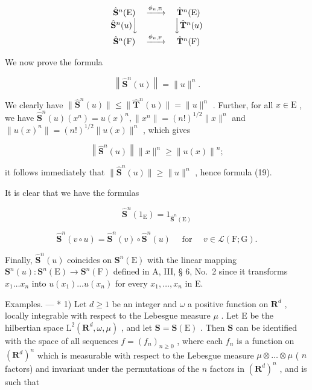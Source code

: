 \[
\begin{array}{c c c} \hat {\mathbf {S}} ^ {n} (\mathrm{E}) & \xrightarrow {\phi_ {n , \mathrm{E}}} & \hat {\mathbf {T}} ^ {n} (\mathrm{E}) \\ \hat {\mathbf {S}} ^ {n} (u) \Big \downarrow & & \Big \downarrow \hat {\mathbf {T}} ^ {n} (u) \\ \hat {\mathbf {S}} ^ {n} (\mathrm{F}) & \xrightarrow {\phi_ {n , \mathrm{F}}} & \hat {\mathbf {T}} ^ {n} (\mathrm{F}) \end{array}
\]

We now prove the formula

\[
\left\| \hat {\mathbf {S}} ^ {n} (u) \right\| = \| u \| ^ {n}.\tag{19}
\]

We clearly have \(\| \hat{\mathbf{S}}^n (u)\| \leqslant \| \hat{\mathbf{T}}^n (u)\| = \| u\| ^n\) . Further, for all \(x\in \mathrm{E}\) , we have \(\hat{\mathbf{S}}^n (u)(x^n) = u(x)^n,\| x^n\| = (n!)^{1 / 2}\| x\| ^n\) and \(\| u(x)^n\| = (n!)^{1 / 2}\| u(x)\| ^n\) , which gives

\[
\left\| \hat {\mathbf {S}} ^ {n} (u) \right\| \| x \| ^ {n} \geqslant \left\| u (x) \right\| ^ {n};
\]

it follows immediately that \(\| \hat{\mathbf{S}}^n (u)\| \geqslant \| u\| ^n\) , hence formula (19).

It is clear that we have the formulas

\[
\hat {\mathbf {S}} ^ {n} (1 _ {\mathrm{E}}) = 1 _ {\hat {\mathbf {S}} ^ {n} (\mathrm{E})}\tag{20}
\]

\[
\hat {\mathbf {S}} ^ {n} (v \circ u) = \hat {\mathbf {S}} ^ {n} (v) \circ \hat {\mathbf {S}} ^ {n} (u) \quad \text { for } \quad v \in \mathscr {L} (\mathrm{F}; \mathrm{G}).\tag{21}
\]

Finally, \(\hat{\mathbf{S}}^n (u)\) coincides on \(\mathbf{S}^n (\mathrm{E})\) with the linear mapping \(\mathbf{S}^n (u):\mathbf{S}^n (\mathrm{E})\to \mathbf{S}^n (\mathrm{F})\) defined in A, III, § 6, No.~2 since it transforms \(x_{1}\ldots x_{n}\) into \(u(x_{1})\ldots u(x_{n})\) for every \(x_{1},\ldots ,x_{n}\) in E.

Examples. --- * 1) Let \(d \geqslant 1\) be an integer and \(\omega\) a positive function on \(\mathbf{R}^{d}\) , locally integrable with respect to the Lebesgue measure \(\mu\) . Let E be the hilbertian space \(\mathrm{L}^{2}(\mathbf{R}^{d}, \omega, \mu)\) , and let \(\mathbf{S} = \mathbf{S}(\mathrm{E})\) . Then \(\mathbf{S}\) can be identified with the space of all sequences \(f = (f_{n})_{n \geqslant 0}\) , where each \(f_{n}\) is a function on \((\mathbf{R}^{d})^{n}\) which is measurable with respect to the Lebesgue measure \(\mu \otimes \ldots \otimes \mu\) ( \(n\) factors) and invariant under the permutations of the \(n\) factors in \((\mathbf{R}^{d})^{n}\) , and is such that

